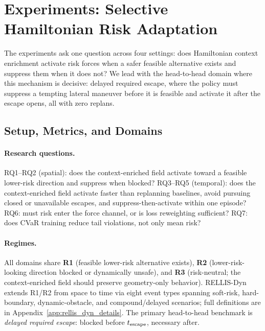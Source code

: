 \section{Experiments: Selective Hamiltonian Risk Adaptation}
\label{sec:experiments}

The experiments ask one question across four settings: does Hamiltonian
context enrichment activate risk forces when a safer feasible alternative
exists and suppress them when it does not? We lead with the head-to-head
domain where this mechanism is decisive: delayed required escape, where
the policy must suppress a tempting lateral maneuver before it is feasible
and activate it after the escape opens, all with zero replans.

\subsection{Setup, Metrics, and Domains}
\label{sec:exp_setup}

\paragraph{Research questions.}
RQ1--RQ2 (spatial): does the context-enriched field activate toward a feasible lower-risk
direction and suppress when blocked?
RQ3--RQ5 (temporal): does the context-enriched field activate faster than replanning
baselines, avoid pursuing closed or unavailable escapes, and
suppress-then-activate within one episode?
RQ6: must risk enter the force channel, or is loss reweighting sufficient?
RQ7: does CVaR training reduce tail violations, not only mean risk?

\paragraph{Regimes.}
All domains share \textbf{R1} (feasible lower-risk alternative exists),
\textbf{R2} (lower-risk-looking direction blocked or dynamically unsafe),
and \textbf{R3} (risk-neutral; the context-enriched field should preserve geometry-only behavior).
RELLIS-Dyn extends R1/R2 from space to time via eight event types spanning
soft-risk, hard-boundary, dynamic-obstacle, and compound/delayed scenarios;
full definitions are in Appendix~\ref{app:rellis_dyn_details}. The primary
head-to-head benchmark is \emph{delayed required escape}: blocked before
$t_{\rm escape}$, necessary after.

